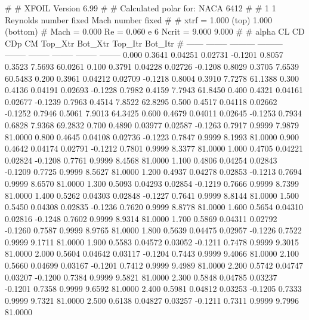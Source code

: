 #  
#       XFOIL         Version 6.99
#  
# Calculated polar for: NACA 6412                                       
#  
# 1 1 Reynolds number fixed          Mach number fixed         
#  
# xtrf =   1.000 (top)        1.000 (bottom)  
# Mach =   0.000     Re =     0.060 e 6     Ncrit =   9.000  9.000
#  
#   alpha    CL        CD       CDp       CM     Top_Xtr  Bot_Xtr  Top_Itr  Bot_Itr
#  ------ -------- --------- --------- -------- -------- -------- -------- --------
   0.000   0.3641   0.04251   0.02731  -0.1201   0.8057   0.3523   7.5693  60.0261
   0.100   0.3791   0.04228   0.02726  -0.1208   0.8029   0.3705   7.6539  60.5483
   0.200   0.3961   0.04212   0.02709  -0.1218   0.8004   0.3910   7.7278  61.1388
   0.300   0.4136   0.04191   0.02693  -0.1228   0.7982   0.4159   7.7943  61.8450
   0.400   0.4321   0.04161   0.02677  -0.1239   0.7963   0.4514   7.8522  62.8295
   0.500   0.4517   0.04118   0.02662  -0.1252   0.7946   0.5061   7.9013  64.3425
   0.600   0.4679   0.04011   0.02645  -0.1253   0.7934   0.6828   7.9368  69.2832
   0.700   0.4890   0.03977   0.02587  -0.1263   0.7917   0.9999   7.9879  81.0000
   0.800   0.4645   0.04108   0.02736  -0.1223   0.7847   0.9999   8.1993  81.0000
   0.900   0.4642   0.04174   0.02791  -0.1212   0.7801   0.9999   8.3377  81.0000
   1.000   0.4705   0.04221   0.02824  -0.1208   0.7761   0.9999   8.4568  81.0000
   1.100   0.4806   0.04254   0.02843  -0.1209   0.7725   0.9999   8.5627  81.0000
   1.200   0.4937   0.04278   0.02853  -0.1213   0.7694   0.9999   8.6570  81.0000
   1.300   0.5093   0.04293   0.02854  -0.1219   0.7666   0.9999   8.7399  81.0000
   1.400   0.5262   0.04303   0.02848  -0.1227   0.7641   0.9999   8.8144  81.0000
   1.500   0.5450   0.04308   0.02835  -0.1236   0.7620   0.9999   8.8778  81.0000
   1.600   0.5654   0.04310   0.02816  -0.1248   0.7602   0.9999   8.9314  81.0000
   1.700   0.5869   0.04311   0.02792  -0.1260   0.7587   0.9999   8.9765  81.0000
   1.800   0.5639   0.04475   0.02957  -0.1226   0.7522   0.9999   9.1711  81.0000
   1.900   0.5583   0.04572   0.03052  -0.1211   0.7478   0.9999   9.3015  81.0000
   2.000   0.5604   0.04642   0.03117  -0.1204   0.7443   0.9999   9.4066  81.0000
   2.100   0.5660   0.04699   0.03167  -0.1201   0.7412   0.9999   9.4989  81.0000
   2.200   0.5742   0.04747   0.03207  -0.1200   0.7384   0.9999   9.5821  81.0000
   2.300   0.5848   0.04785   0.03237  -0.1201   0.7358   0.9999   9.6592  81.0000
   2.400   0.5981   0.04812   0.03253  -0.1205   0.7333   0.9999   9.7321  81.0000
   2.500   0.6138   0.04827   0.03257  -0.1211   0.7311   0.9999   9.7996  81.0000
